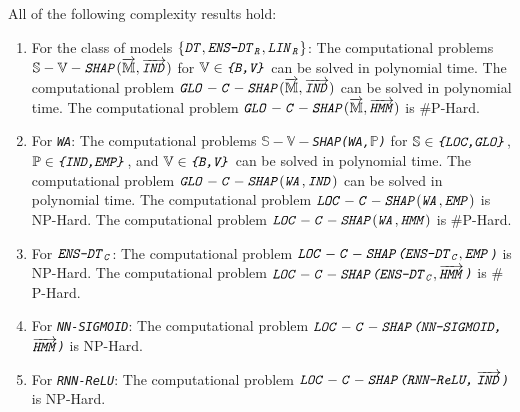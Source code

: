 \begin{corollary} All of the following complexity results hold:
\begin{enumerate} 
    \item For the class of models $\{\texttt{\emph{DT}}, \texttt{\emph{ENS-DT}}_{\texttt{\emph{R}}}, \texttt{\emph{LIN}}_{\texttt{\emph{R}}}\}$: The computational problems $\mathbb{S}-\mathbb{V}-\texttt{\emph{SHAP}}(\overrightarrow{\mathbb{M}},
    \overrightarrow{\texttt{\emph{IND}}})$ for  $\mathbb{V}\in\texttt{\emph{\{B,V\}}}$ can be solved in polynomial time. The computational problem $\texttt{\emph{GLO}}-\texttt{\emph{C}}-\texttt{\emph{SHAP}}(\overrightarrow{\mathbb{M}}, 
    \overrightarrow{\texttt{\emph{IND}}})$ can be solved in polynomial time.
    The computational problem $\texttt{\emph{GLO}}-\texttt{\emph{C}}-\texttt{\emph{SHAP}}(\overrightarrow{\mathbb{M}}, 
    \overrightarrow{\texttt{\emph{HMM}}})$ is $\#$P-Hard.
    
    \item For \texttt{\emph{WA}}:  The computational problems         $\mathbb{S}-\mathbb{V}-$\texttt{\emph{SHAP(WA,}}$\mathbb{P}$\texttt{\emph{)}} for $\mathbb{S}\in\texttt{\emph{\{LOC,GLO\}}}$, $\mathbb{P}\in\texttt{\emph{\{IND,EMP\}}}$, and $\mathbb{V}\in\texttt{\emph{\{B,V\}}}$ can be solved in polynomial time. The computational problem $\texttt{\emph{GLO}}-\texttt{\emph{C}}-\texttt{\emph{SHAP}}(\texttt{\emph{WA}}, 
    \texttt{\emph{IND}})$ can be solved in polynomial time. The computational problem $\texttt{\emph{LOC}}-\texttt{\emph{C}}-\texttt{\emph{SHAP}}(\texttt{\emph{WA}}, 
    \texttt{\emph{EMP}})$ is NP-Hard. The computational problem $\texttt{\emph{LOC}}-\texttt{\emph{C}}-\texttt{\emph{SHAP}}(\texttt{\emph{WA}}, 
    \texttt{\emph{HMM}})$ is $\#$P-Hard.
    \item For $\texttt{\emph{ENS-DT}}_{\texttt{\emph{C}}}$: The computational problem $\texttt{\emph{LOC}}-\texttt{\emph{C}}-\texttt{\emph{SHAP}}\texttt{\emph{(ENS-DT}}_{\texttt{\emph{C}}}, \texttt{\emph{EMP}}$\texttt{\emph{)}} is NP-Hard. The computational problem $\texttt{\emph{LOC}}-\texttt{\emph{C}}-\texttt{\emph{SHAP}}\texttt{\emph{(ENS-DT}}_{\texttt{\emph{C}}},\overrightarrow{\texttt{\emph{HMM}}}$\texttt{\emph{)}} is $\#$P-Hard.

    \item For \texttt{\emph{NN-SIGMOID}}: The computational problem $\texttt{\emph{LOC}}-\texttt{\emph{C}}-\texttt{\emph{SHAP}}\texttt{\emph{(NN-SIGMOID,}}$$\overrightarrow{\texttt{\emph{HMM}}}$\texttt{\emph{)}} is NP-Hard.

    \item For \texttt{\emph{RNN-ReLU}}: The computational problem $\texttt{\emph{LOC}}-\texttt{\emph{C}}-\texttt{\emph{SHAP}}\texttt{\emph{(RNN-ReLU,}}$$\overrightarrow{\texttt{\emph{IND}}}$\texttt{\emph{)}} is NP-Hard.


\end{enumerate}
\end{corollary}
